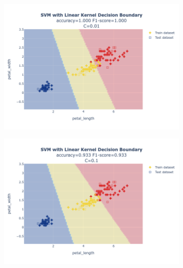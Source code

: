 \documentclass{article}
\begin{document}
\begin{figure}
    \begin{subfigure}{0.3\textwidth}
        \centering
        \includegraphics[scale=.13]{images/implementation/q1/linear_kernel/petal_length_petal_width_0.01.png}
    \end{subfigure}
    \hfill
    \begin{subfigure}{0.3\textwidth}
        \centering
        \includegraphics[scale=.13]{images/implementation/q1/linear_kernel/petal_length_petal_width_0.1.png}
    \end{subfigure}
    \hfill
    \begin{subfigure}{0.3\textwidth}
        \centering

\end{subfigure}
\end{figure}
\end{document}
